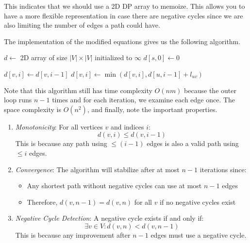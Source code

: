 \documentclass{article}
\begin{document}
    This indicates that we should use a 2D DP array to memoize. This allows you to have a more flexible representation in case there are negative cycles since we are also limiting the number of edges a path could have. 

    \begin{algo}
      The implementation of the modified equations gives us the following algorithm. 
      \begin{algorithm}[H]
        \label{alg:bellman_ford_leq}
        \begin{algorithmic}[1]
          \State $d \gets$ 2D array of size $|V| \times |V|$ initialized to $\infty$
          \State $d[s,0] \gets 0$ 
          
              \State $d[v,i] \gets d[v,i-1]$ 
                \State $d[v,i] \gets \min(d[v,i], d[u,i-1] + l_{uv})$
              \EndFor
            \EndFor
          \EndFor
        \end{algorithmic}
      \end{algorithm}
      Note that this algorithm still has time complexity $O(nm)$ because the outer loop runs $n-1$ times and for each iteration, we examine each edge once. The space complexity is $O(n^2)$, and finally, note the important properties. 
      \begin{enumerate}
        \item \textit{Monotonicity}: For all vertices $v$ and indices $i$:
        \begin{equation}
          d(v,i) \leq d(v,i-1)
        \end{equation}
        This is because any path using $\leq (i-1)$ edges is also a valid path using $\leq i$ edges.

        \item \textit{Convergence}: The algorithm will stabilize after at most $n-1$ iterations since:
        \begin{itemize}
          \item Any shortest path without negative cycles can use at most $n-1$ edges
          \item Therefore, $d(v,n-1) = d(v,n)$ for all $v$ if no negative cycles exist
        \end{itemize}

        \item \textit{Negative Cycle Detection}: A negative cycle exists if and only if:
        \begin{equation}
          \exists v \in V : d(v,n) < d(v,n-1)
        \end{equation}
        This is because any improvement after $n-1$ edges must use a negative cycle.
      \end{enumerate}
    \end{algo}
\end{document}
